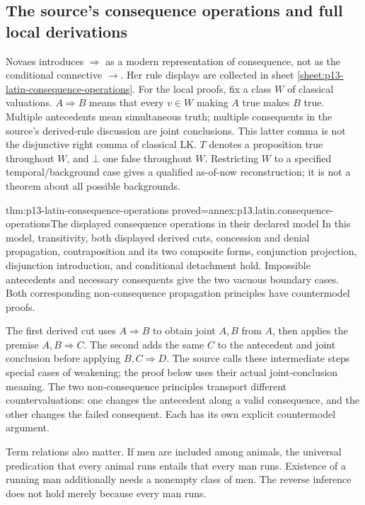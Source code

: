 \subsection{The source's consequence operations and full local derivations}

Novaes introduces \(\Rightarrow\) as a modern representation of consequence,
not as the conditional connective \(\to\).
Her rule displays are collected in
sheet \ref{sheet:p13-latin-consequence-operations}.
For the local proofs, fix a class \(W\) of classical valuations.
\(A\Rightarrow B\) means that every \(v\in W\) making \(A\) true makes
\(B\) true. Multiple antecedents mean simultaneous truth; multiple
consequents in the source's derived-rule discussion are joint conclusions.
This latter comma is not the disjunctive right comma of classical LK.
\(T\) denotes a proposition true throughout \(W\), and \(\bot\) one
false throughout \(W\).
Restricting \(W\) to a specified temporal/background case gives a
qualified as-of-now reconstruction; it is not a theorem about all possible
backgrounds.

\begin{hblemma}{thm:p13-latin-consequence-operations}
 {proved=annex:p13.latin.consequence-operations}{The displayed consequence operations in their declared model}
In this model, transitivity, both displayed derived cuts, concession and
denial propagation, contraposition and its two composite forms,
conjunction projection, disjunction introduction, and conditional detachment
hold. Impossible antecedents and necessary consequents give the two
vacuous boundary cases. Both corresponding non-consequence
propagation principles have countermodel proofs.
\end{hblemma}

The first derived cut uses \(A\Rightarrow B\) to obtain joint
\(A,B\) from \(A\), then applies the premise \(A,B\Rightarrow C\).
The second adds the same \(C\) to the antecedent and joint conclusion
before applying \(B,C\Rightarrow D\).
The source calls these intermediate steps special cases of weakening;
the proof below uses their actual joint-conclusion meaning.
The two non-consequence principles transport different countervaluations:
one changes the antecedent along a valid consequence, and the other changes
the failed consequent. Each has its own explicit countermodel argument.

Term relations also matter. If men are included among animals, the
universal predication that every animal runs entails that every man runs.
Existence of a running man additionally needs a nonempty class of men.
The reverse inference does not hold merely because every man runs.

